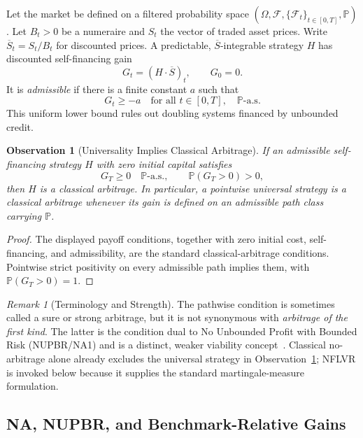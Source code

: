 \documentclass[aps,pra,reprint,superscriptaddress,amsmath,amssymb,floatfix]{revtex4-2}
\theoremstyle{plain}
\newtheorem{observation}[theorem]{Observation}
\theoremstyle{definition}
\theoremstyle{remark}
\newtheorem{remark}{Remark}
\begin{document}
Let the market be defined on a filtered probability space
\((\Omega,\mathcal{F},\{\mathcal{F}_t\}_{t\in[0,T]},\mathbb{P})\).
Let \(B_t>0\) be a numeraire and \(S_t\) the vector of traded asset prices.
Write \(\overline S_t=S_t/B_t\) for discounted prices. A predictable,
\(\overline S\)-integrable strategy \(H\) has discounted self-financing gain
\begin{equation}
  G_t=(H\mathbin{\cdot}\overline S)_t,\qquad G_0=0.
  \label{eq:gain}
\end{equation}
It is \emph{admissible} if there is a finite constant \(a\) such that
\begin{equation}
  G_t\geq -a\quad\text{for all }t\in[0,T],\quad\mathbb{P}\text{-a.s.}
  \label{eq:admissible}
\end{equation}
This uniform lower bound rules out doubling systems financed by unbounded
credit.

\begin{observation}[Universality Implies Classical Arbitrage]
  \label{thm:arbitrage}
  If an admissible self-financing strategy \(H\) with zero initial capital
  satisfies
  \[
    G_T\geq0\quad\mathbb{P}\text{-a.s.},
    \qquad
    \mathbb{P}(G_T>0)>0,
  \]
  then \(H\) is a classical arbitrage. In particular, a pointwise universal
  strategy is a classical arbitrage whenever its gain is defined on an
  admissible path class carrying \(\mathbb{P}\).
\end{observation}

\begin{proof}
The displayed payoff conditions, together with zero initial cost,
self-financing, and admissibility, are the standard classical-arbitrage
conditions. Pointwise strict positivity on every admissible path implies them,
with \(\mathbb{P}(G_T>0)=1\).
\end{proof}

\begin{remark}[Terminology and Strength]
The pathwise condition is sometimes called a sure or strong arbitrage, but it
is not synonymous with \emph{arbitrage of the first kind}. The latter is the
condition dual to No Unbounded Profit with Bounded Risk (NUPBR/NA1) and is a
distinct, weaker viability concept~\cite{Kardaras2012}. Classical
no-arbitrage alone already excludes the universal strategy in
Observation~\ref{thm:arbitrage}; NFLVR is invoked below because it supplies the
standard martingale-measure formulation.
\end{remark}

\subsection{NA, NUPBR, and Benchmark-Relative Gains}
\end{document}

